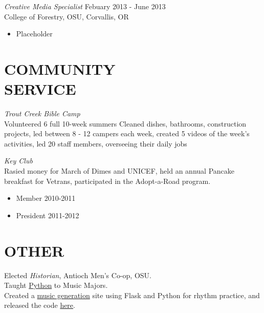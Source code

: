 \documentclass[line,margin]{res}
\begin{document}
\begin{resume}
                    {\sl Creative Media Specialist} \hfill Febuary 2013 - June 2013 \\
                    College of Forestry, OSU,
                    Corvallis, OR
                    \begin{itemize}
                       \item Placeholder
                    \end{itemize} 
 
\section{COMMUNITY \\ SERVICE}  
                {\sl Trout Creek Bible Camp\\}
                    Volunteered 6 full 10-week summers
                    Cleaned dishes, bathrooms, construction projects,
                    led between 8 - 12 campers each week,
                    created 5 videos of the week's activities,
                    led 20 staff members, overseeing their daily jobs

                {\sl Key Club\\}
                    Rasied money for March of Dimes and UNICEF, held an annual Pancake breakfast
                    for Vetrans, participated in the Adopt-a-Road program.
                    \begin{itemize}  \itemsep -2pt %
                        \item Member 2010-2011
                        \item President 2011-2012
                    \end{itemize}

\section{OTHER\\}             
            Elected {\it Historian}, Antioch Men's Co-op, OSU. \\
            Taught \href{https://github.com/fahlmant/LessonsForMusicMajors}{Python} to Music Majors. \\
            Created a \href{http://music.tfahl.com}{music generation} site using Flask and Python for rhythm practice,
            and released the code \href{https://github.com/fahlmant/RhythmGenerator}{here}.


\end{resume}
\end{document}
